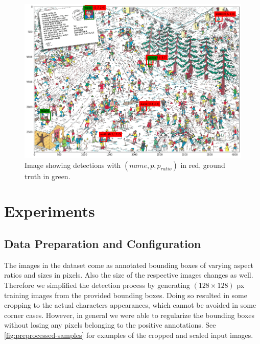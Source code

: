 \documentclass[11pt]{article}
\begin{document}
\begin{figure}[h]
    \centering
    \includegraphics[width=0.8\linewidth]{figures/waldo_winter} 
    \caption{Image showing detections with \( (name, p, p_{ratio}) \) in red, ground truth in green.}
    \label{fig:waldo-winter}
\end{figure}

\section{Experiments}
\subsection{Data Preparation and Configuration}\label{subsec:data-prep}

The images in the dataset come as annotated bounding boxes of varying aspect ratios and sizes in pixels.
Also the size of the respective images changes as well. Therefore we simplified the detection process by
generating \( (128 \times 128) \) px training images from the provided bounding boxes. 
Doing so resulted in some cropping to the actual characters appearances, which cannot be avoided in some corner cases.
However, in general we were able to regularize the bounding boxes without losing any pixels belonging to the positive annotations.
See \autoref{fig:preprocessed-samples} for examples of the cropped and scaled input images.
\end{document}
